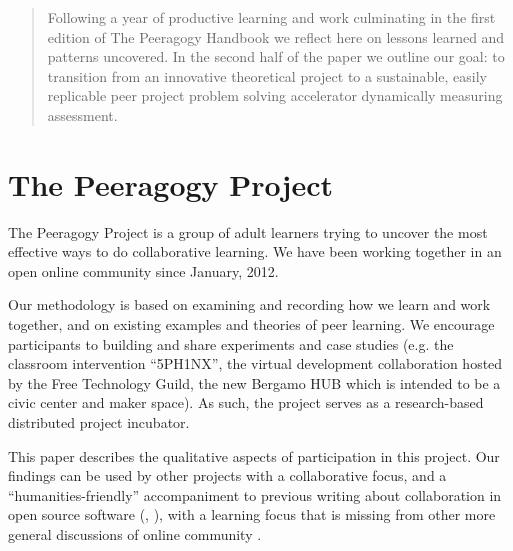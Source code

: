 \documentclass{acm_proc_article-sp}
\begin{document}


\maketitle
\begin{abstract}

Following a year of productive learning and work culminating in the first edition of The Peeragogy Handbook we reflect here on lessons learned and patterns uncovered. In the second half of the paper we outline our goal: to transition from an innovative theoretical project to a sustainable, easily replicable peer project problem solving accelerator dynamically measuring assessment.

\end{abstract}

\section{The Peeragogy Project}

The Peeragogy Project is a group of adult learners trying to uncover
the most effective ways to do collaborative learning.  We have been
working together in an open online community since January, 2012.  

Our methodology is based on examining and recording how we learn and
work together, and on existing examples and theories of peer learning.
We encourage participants to building and share experiments and case
studies (e.g. the classroom intervention ``5PH1NX'', the virtual
development collaboration hosted by the Free Technology Guild, the new
Bergamo HUB which is intended to be a civic center and maker space).
As such, the project serves as a research-based distributed project
incubator.

This paper describes the qualitative aspects of participation in this
project.  Our findings can be used by other projects with a
collaborative focus, and a ``humanities-friendly'' accompaniment to
previous writing about collaboration in open source software
(\cite{OpenAdvice}, \cite{crowstonXdefiningX2003}), with a learning
focus that is missing from other more general discussions of online
community \cite{bacon2012art}.
\end{document}
